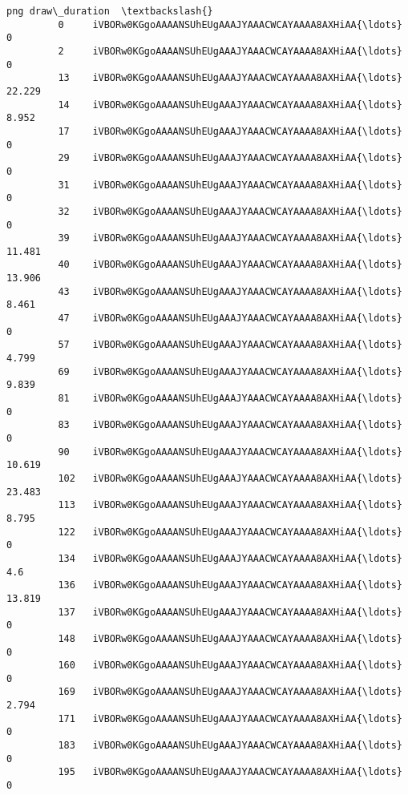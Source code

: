 \documentclass[11pt]{article}
\begin{document}
\begin{Verbatim}[commandchars=\\\{\}]
                                                             png draw\_duration  \textbackslash{}
         0     iVBORw0KGgoAAAANSUhEUgAAAJYAAACWCAYAAAA8AXHiAA{\ldots}             0   
         2     iVBORw0KGgoAAAANSUhEUgAAAJYAAACWCAYAAAA8AXHiAA{\ldots}             0   
         13    iVBORw0KGgoAAAANSUhEUgAAAJYAAACWCAYAAAA8AXHiAA{\ldots}        22.229   
         14    iVBORw0KGgoAAAANSUhEUgAAAJYAAACWCAYAAAA8AXHiAA{\ldots}         8.952   
         17    iVBORw0KGgoAAAANSUhEUgAAAJYAAACWCAYAAAA8AXHiAA{\ldots}             0   
         29    iVBORw0KGgoAAAANSUhEUgAAAJYAAACWCAYAAAA8AXHiAA{\ldots}             0   
         31    iVBORw0KGgoAAAANSUhEUgAAAJYAAACWCAYAAAA8AXHiAA{\ldots}             0   
         32    iVBORw0KGgoAAAANSUhEUgAAAJYAAACWCAYAAAA8AXHiAA{\ldots}             0   
         39    iVBORw0KGgoAAAANSUhEUgAAAJYAAACWCAYAAAA8AXHiAA{\ldots}        11.481   
         40    iVBORw0KGgoAAAANSUhEUgAAAJYAAACWCAYAAAA8AXHiAA{\ldots}        13.906   
         43    iVBORw0KGgoAAAANSUhEUgAAAJYAAACWCAYAAAA8AXHiAA{\ldots}         8.461   
         47    iVBORw0KGgoAAAANSUhEUgAAAJYAAACWCAYAAAA8AXHiAA{\ldots}             0   
         57    iVBORw0KGgoAAAANSUhEUgAAAJYAAACWCAYAAAA8AXHiAA{\ldots}         4.799   
         69    iVBORw0KGgoAAAANSUhEUgAAAJYAAACWCAYAAAA8AXHiAA{\ldots}         9.839   
         81    iVBORw0KGgoAAAANSUhEUgAAAJYAAACWCAYAAAA8AXHiAA{\ldots}             0   
         83    iVBORw0KGgoAAAANSUhEUgAAAJYAAACWCAYAAAA8AXHiAA{\ldots}             0   
         90    iVBORw0KGgoAAAANSUhEUgAAAJYAAACWCAYAAAA8AXHiAA{\ldots}        10.619   
         102   iVBORw0KGgoAAAANSUhEUgAAAJYAAACWCAYAAAA8AXHiAA{\ldots}        23.483   
         113   iVBORw0KGgoAAAANSUhEUgAAAJYAAACWCAYAAAA8AXHiAA{\ldots}         8.795   
         122   iVBORw0KGgoAAAANSUhEUgAAAJYAAACWCAYAAAA8AXHiAA{\ldots}             0   
         134   iVBORw0KGgoAAAANSUhEUgAAAJYAAACWCAYAAAA8AXHiAA{\ldots}           4.6   
         136   iVBORw0KGgoAAAANSUhEUgAAAJYAAACWCAYAAAA8AXHiAA{\ldots}        13.819   
         137   iVBORw0KGgoAAAANSUhEUgAAAJYAAACWCAYAAAA8AXHiAA{\ldots}             0   
         148   iVBORw0KGgoAAAANSUhEUgAAAJYAAACWCAYAAAA8AXHiAA{\ldots}             0   
         160   iVBORw0KGgoAAAANSUhEUgAAAJYAAACWCAYAAAA8AXHiAA{\ldots}             0   
         169   iVBORw0KGgoAAAANSUhEUgAAAJYAAACWCAYAAAA8AXHiAA{\ldots}         2.794   
         171   iVBORw0KGgoAAAANSUhEUgAAAJYAAACWCAYAAAA8AXHiAA{\ldots}             0   
         183   iVBORw0KGgoAAAANSUhEUgAAAJYAAACWCAYAAAA8AXHiAA{\ldots}             0   
         195   iVBORw0KGgoAAAANSUhEUgAAAJYAAACWCAYAAAA8AXHiAA{\ldots}             0   

\end{Verbatim}
\end{document}
